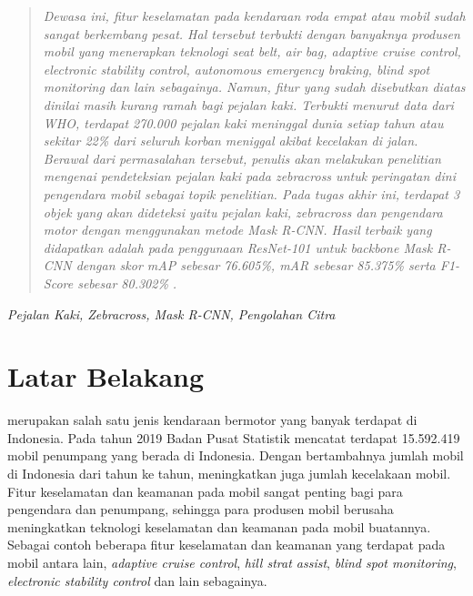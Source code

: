 \documentclass[conference]{IEEEtran}
\begin{document}
	
	\begin{abstract}
		\textit{Dewasa ini, fitur keselamatan pada kendaraan roda empat atau mobil sudah sangat berkembang pesat. Hal tersebut terbukti dengan banyaknya produsen mobil yang menerapkan teknologi seat belt, air bag, adaptive cruise control, electronic stability control, autonomous emergency braking, blind spot monitoring dan lain sebagainya. Namun, fitur yang sudah disebutkan diatas dinilai masih kurang ramah bagi pejalan kaki. Terbukti menurut data dari WHO, terdapat 270.000 pejalan kaki meninggal dunia setiap tahun atau sekitar 22\% dari seluruh korban meniggal akibat kecelakan di jalan. Berawal dari permasalahan tersebut, penulis akan melakukan penelitian mengenai pendeteksian pejalan kaki pada zebracross untuk peringatan dini pengendara mobil sebagai topik penelitian. Pada tugas akhir ini, terdapat 3 objek yang akan dideteksi yaitu pejalan kaki, zebracross dan pengendara motor dengan menggunakan metode Mask R-CNN. Hasil terbaik yang didapatkan adalah pada penggunaan \textit{ResNet-101} untuk \textit{backbone Mask R-CNN} dengan skor \textit{mAP} sebesar 76.605\%, mAR sebesar 85.375\% serta \textit{F1-Score} sebesar 80.302\% .}
	\end{abstract}
	\begin{IEEEkeywords}
		\textit{Pejalan Kaki, Zebracross, Mask R-CNN, Pengolahan Citra}
	\end{IEEEkeywords}
	
	\section{Latar Belakang}
	 merupakan salah satu jenis kendaraan bermotor yang banyak terdapat di Indonesia. Pada tahun 2019 Badan Pusat Statistik mencatat terdapat 15.592.419 mobil penumpang yang berada di Indonesia. Dengan bertambahnya jumlah mobil di Indonesia dari tahun ke tahun, meningkatkan juga jumlah kecelakaan mobil. Fitur keselamatan dan keamanan pada mobil sangat penting bagi para pengendara dan penumpang, sehingga para produsen mobil berusaha meningkatkan teknologi keselamatan dan keamanan pada mobil buatannya. Sebagai contoh beberapa fitur keselamatan dan keamanan yang terdapat pada mobil antara lain, \textit{adaptive cruise control}, \textit{hill strat assist}, \textit{blind spot monitoring}, \textit{electronic stability control} dan lain sebagainya.
	
	\vspace{1ex}
	
\end{document}
